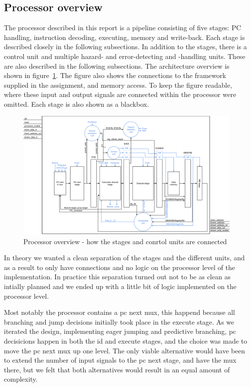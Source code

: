 \subsection{Processor overview}

The processor described in this report is a pipeline consisting of five stages:
PC handling, instruction decoding, executing, memory and write-back. Each stage
is described closely in the following subsections. In addition to the stages, 
there is a control unit and multiple hazard- and error-detecting and -handling units. 
These are also described in the following subsections. The architecture overview is 
shown in figure~\ref{fig:processor}. The figure also shows the connections to the 
framework supplied in the assignment, and memory access. To keep the figure readable, where these input and output signals are connected within the processor were omitted. Each stage is also shown as a blackbox.

\begin{figure}[ht]
        \centerline{\includegraphics[width=500px]{figures/processor_arch}}
        \caption{Processor overview  - how the stages and conrtol units are connected}
        \label{fig:processor}
\end{figure}

In theory we wanted a clean separation of the stages and the different units,
and as a result to only have connections and no logic on the processor level of the implementation.
In practice this separation turned out not to be as clean as intially planned
and we ended up with a little bit of logic implemented on the processor level.

Most notably the processor contains a pc next mux, this happend because 
all branching and jump decisions initially took place in the execute stage. As we iterated the 
design, implementing eager jumping and predictive branching, pc decisicions happen
in both the id and execute stages, and the choice was made to move the pc next mux up one level.
The only viable alternative would have been to extend the number of input signals to the 
pc next stage, and have the mux there, but we felt that both alternatives would result
in an equal amount of complexity.

